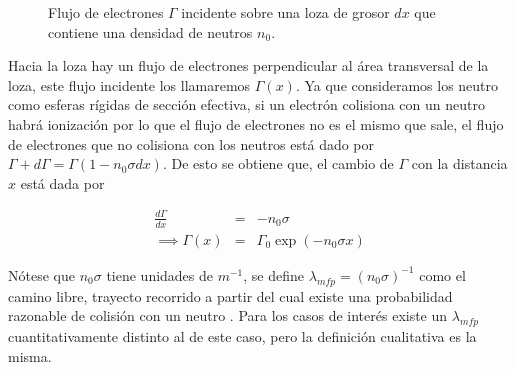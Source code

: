     \begin{figure}[hbt!]
 		\label{fig:slabdx}
 		\centering
 		\caption{Flujo de electrones $\Gamma$ incidente sobre una loza de grosor $dx$ que contiene una densidad de neutros $n_0$.}
 	\end{figure}

    Hacia la loza hay un flujo de electrones perpendicular al \'area transversal de la loza, este flujo incidente los llamaremos $\Gamma(x)$. Ya que consideramos los neutro como esferas r\'igidas de secci\'on efectiva, si un electr\'on colisiona con un neutro habr\'a ionizaci\'on por lo que el flujo de electrones no es el mismo que sale, el flujo de electrones que no colisiona con los neutros est\'a dado por $\Gamma + d\Gamma = \Gamma(1 - n_0\sigma dx)$. De esto se obtiene que, el cambio de $\Gamma$ con la distancia $x$ est\'a dada por 

    \begin{eqnarray}
      \frac{d\Gamma}{dx} &=& -n_0\sigma \nonumber\\
      \implies \Gamma(x) &=& \Gamma_0\exp{(-n_0\sigma x)} \nonumber
    \end{eqnarray}
  
    N\'otese que $n_0\sigma$ tiene unidades de $m^{-1}$, se define $\lambda_{mfp} = (n_0\sigma)^{-1}$ como el camino libre, trayecto recorrido a partir del cual existe una probabilidad razonable de colisi\'on con un neutro \cite{goldston1995}. Para los casos de inter\'es existe un $\lambda_{mfp}$ cuantitativamente distinto al de este caso, pero la definici\'on cualitativa es la misma.

